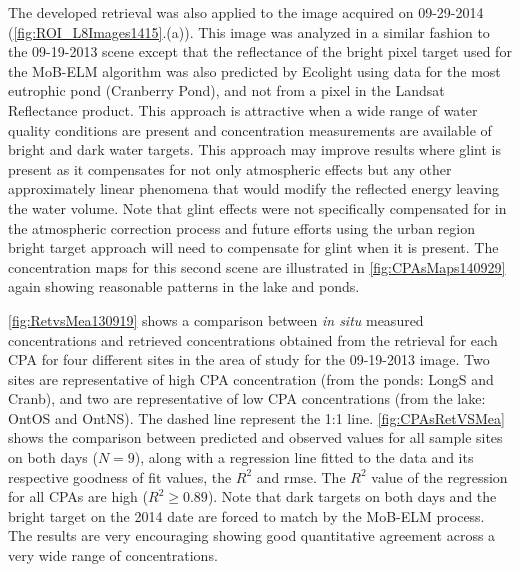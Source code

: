 

The developed retrieval was also applied to the image acquired on 09-29-2014 (\autoref{fig:ROI_L8Images1415}.(a)). This image was analyzed in a similar fashion to the 09-19-2013 scene except that the reflectance of the bright pixel target used for the MoB-ELM algorithm was also predicted by Ecolight using data for the most eutrophic pond (Cranberry Pond), and not from a pixel in the Landsat Reflectance product. This approach is attractive when a wide range of water quality conditions are present and concentration measurements are available of bright and dark water targets. This approach may improve results where glint is present as it compensates for not only atmospheric effects but any other approximately linear phenomena that would modify the reflected energy leaving the water volume. Note that glint effects were not specifically compensated for in the atmospheric correction process and future efforts using the urban region bright target approach will need to compensate for glint when it is present. The concentration maps for this second scene are illustrated in \autoref{fig:CPAsMaps140929} again showing reasonable patterns in the lake and ponds. 


\autoref{fig:RetvsMea130919} shows a comparison between {\it in situ} measured concentrations and retrieved concentrations obtained from the retrieval for each CPA for four different sites in the area of study for the 09-19-2013 image. Two sites are representative of high CPA concentration (from the ponds: LongS and Cranb), and two are representative of low CPA concentrations (from the lake: OntOS and OntNS). The dashed line represent the 1:1 line. \autoref{fig:CPAsRetVSMea} shows the comparison between predicted and observed values for all sample sites on both days ($N=9$), along with a regression line fitted to the data and its respective goodness of fit values, the $R^2$ and \gls{rmse}. The $R^2$ value of the regression for all CPAs are high ($R^2\geq0.89$). Note that dark targets on both days and the bright target on the 2014 date are forced to match by the MoB-ELM process. The results are very encouraging showing good quantitative agreement across a very wide range of concentrations. 

